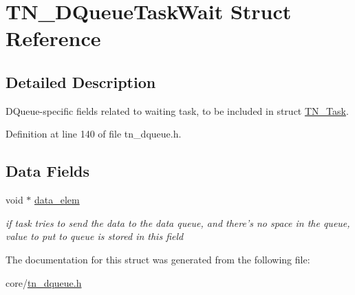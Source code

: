 \hypertarget{structTN__DQueueTaskWait}{\section{T\+N\+\_\+\+D\+Queue\+Task\+Wait Struct Reference}
\label{structTN__DQueueTaskWait}
}


\subsection{Detailed Description}
D\+Queue-\/specific fields related to waiting task, to be included in struct \hyperlink{structTN__Task}{T\+N\+\_\+\+Task}. 

Definition at line 140 of file tn\+\_\+dqueue.\+h.

\subsection*{Data Fields}
\begin{DoxyCompactItemize}
\item 
\hypertarget{structTN__DQueueTaskWait_aa3dd6acde9f906208285e539e7c1949d}{void $\ast$ \hyperlink{structTN__DQueueTaskWait_aa3dd6acde9f906208285e539e7c1949d}{data\+\_\+elem}}\label{structTN__DQueueTaskWait_aa3dd6acde9f906208285e539e7c1949d}

\begin{DoxyCompactList}\small\item\em if task tries to send the data to the data queue, and there's no space in the queue, value to put to queue is stored in this field \end{DoxyCompactList}\end{DoxyCompactItemize}


The documentation for this struct was generated from the following file\+:\begin{DoxyCompactItemize}
\item 
core/\hyperlink{tn__dqueue_8h}{tn\+\_\+dqueue.\+h}\end{DoxyCompactItemize}
